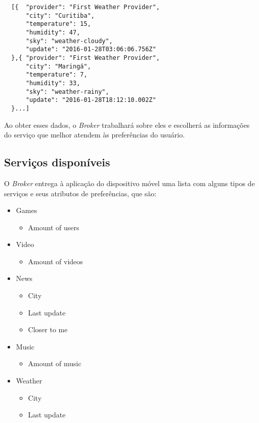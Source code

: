 \begin{verbatim}
  [{  "provider": "First Weather Provider",
      "city": "Curitiba",
      "temperature": 15,
      "humidity": 47,
      "sky": "weather-cloudy",
      "update": "2016-01-28T03:06:06.756Z"
  },{ "provider": "First Weather Provider",
      "city": "Maringá",
      "temperature": 7,
      "humidity": 33,
      "sky": "weather-rainy",
      "update": "2016-01-28T18:12:10.002Z"
  }...]
\end{verbatim}

Ao obter esses dados, o \textit{Broker} trabalhará sobre eles e escolherá as informações do serviço que melhor atendem às preferências do usuário.

\subsection{Serviços disponíveis}
O \textit{Broker} entrega à aplicação do dispositivo móvel uma lista com alguns tipos de serviços e seus atributos de preferências, que são:

\begin{itemize}
  \item Games
    \begin{itemize}
      \item Amount of users
    \end{itemize}
  \item Video
    \begin{itemize}
      \item Amount of videos
    \end{itemize}
  \item News
    \begin{itemize}
      \item City
      \item Last update
      \item Closer to me
    \end{itemize}
  \item Music
    \begin{itemize}
      \item Amount of music
    \end{itemize}
  \item Weather
    \begin{itemize}
      \item City
      \item Last update
    \end{itemize}
\end{itemize}

